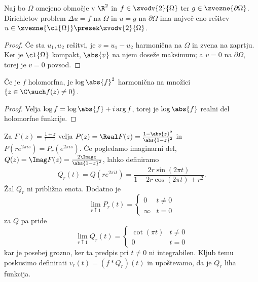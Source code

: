 
\begin{izrek}
  Naj bo $\Omega$ omejeno območje v $\R^2$ in $f \in \zvodv{2}{\Omega}$ ter $g
  \in \zvezne{\partial \Omega}$.
  Dirichletov problem $\Delta u = f$ na $\Omega$ in $u = g$ na $\partial \Omega$
  ima največ eno rešitev $u \in \zvezne{\cl{\Omega}} \presek \zvodv{2}{\Omega}$.
\end{izrek}

\begin{proof}
  Če sta $u_1, u_2$ rešitvi, je $v = u_1 - u_2$ harmonična na $\Omega$ in zvena
  na zaprtju.
  Ker je $\cl{\Omega}$ kompakt, $\abs{v}$ na njem doseže maksimum; a $v = 0$ na
  $\partial \Omega$, torej je $v = 0$ povsod.
\end{proof}


\begin{trditev}
  Če je $f$ holomorfna, je $\log \abs{f}^2$ harmonična na množici $\{z \in \C
  \such f(z) \ne 0\}$.
\end{trditev}

\begin{proof}
  Velja $\log f = \log \abs{f} + i \arg f$, torej je $\log \abs{f}$ realni del
  holomorfne funkcije.
\end{proof}

Za $F(z) = \frac{1+z}{1-z}$ velja $P(z) = \Real F(z) = \frac{1 -
  \abs{z}^2}{\abs{1-z}^2}$ in $P(r e^{2 \pi i s}) = P_r(e^{2 \pi i s})$.
Če pogledamo imaginarni del, $Q(z) = \Imag F(z) = \frac{2 \Imag z}{\abs{1
	-z}^2}$, lahko definiramo
\[
  Q_r(t) = Q(r e^{2 \pi i t}) = \frac{2 r \sin(2 \pi t)}{1 - 2r \cos(2 \pi t) +
	r^2}.
\]
Žal $Q_r$ ni približna enota.
Dodatno je
\[
  \lim_{r \uparrow 1} P_r(t) =
  \begin{cases}
	0 & t \ne 0 \\
	\infty & t = 0
  \end{cases}
\]
za $Q$ pa pride
\[
  \lim_{r \uparrow 1} Q_r(t) =
  \begin{cases}
	\cot(\pi t) & t \ne 0 \\
	0 & t = 0
  \end{cases}
\]
kar je posebej grozno, ker ta predpis pri $t \ne 0$ ni integrabilen.
Kljub temu poskusimo definirati $v_r(t) = (f * Q_r)(t)$ in upoštevamo, da je
$Q_r$ liha funkcija.

